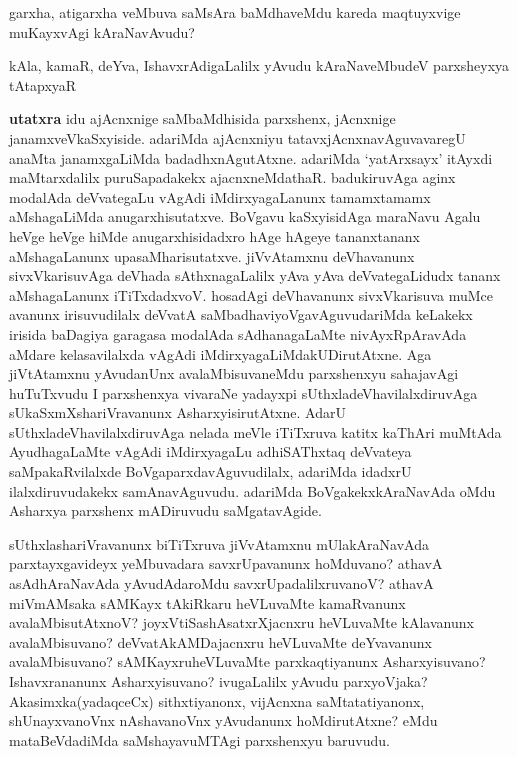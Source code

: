 
\begin{artha}
garxha, atigarxha veMbuva saMsAra baMdhaveMdu kareda maqtuyxvige muKayxvAgi kAraNavAvudu?

kAla, kamaR, deYva, IshavxrAdigaLalilx yAvudu kAraNaveMbudeV parxsheyxya tAtapxyaR\ndash 

\textbf{utatxra \ndash } idu ajAcnxnige saMbaMdhisida parxshenx, jAcnxnige janamxveVkaSxyiside. adariMda ajAcnxniyu tatavxjAcnxnavAguvavaregU  anaMta janamxgaLiMda badadhxnAgutAtxne. adariMda `yatArxsayx' itAyxdi maMtarxdalilx puruSapadakekx ajacnxneMdathaR. badukiruvAga aginx modalAda deVvategaLu vAgAdi iMdirxyagaLanunx tamamxtamamx aMshagaLiMda anugarxhisutatxve. BoVgavu kaSxyisidAga maraNavu Agalu heVge heVge hiMde  anugarxhisidadxro hAge hAgeye tananxtananx aMshagaLanunx upasaMharisutatxve. jiVvAtamxnu deVhavanunx sivxVkarisuvAga deVhada sAthxnagaLalilx yAva yAva deVvategaLidudx tananx aMshagaLanunx iTiTxdadxvoV. hosadAgi deVhavanunx sivxVkarisuva muMce avanunx irisuvudilalx deVvatA saMbadhaviyoVgavAguvudariMda keLakekx irisida baDagiya garagasa modalAda sAdhanagaLaMte nivAyxRpAravAda aMdare kelasavilalxda vAgAdi iMdirxyagaLiMdakUDirutAtxne. Aga jiVtAtamxnu yAvudanUnx avalaMbisuvaneMdu parxshenxyu sahajavAgi huTuTxvudu \ndash  I parxshenxya vivaraNe \ndash  yadayxpi sUthxladeVhavilalxdiruvAga sUkaSxmXshariVravanunx AsharxyisirutAtxne. AdarU sUthxladeVhavilalxdiruvAga nelada meVle iTiTxruva katitx kaThAri muMtAda AyudhagaLaMte vAgAdi iMdirxyagaLu adhiSAThxtaq deVvateya saMpakaRvilalxde BoVgaparxdavAguvudilalx, adariMda idadxrU ilalxdiruvudakekx samAnavAguvudu. adariMda BoVgakekxkAraNavAda oMdu Asharxya parxshenx mADiruvudu saMgatavAgide.

sUthxlashariVravanunx biTiTxruva jiVvAtamxnu mUlakAraNavAda parxtayxgavideyx yeMbuvadara savxrUpavanunx hoMduvano? athavA asAdhAraNavAda yAvudAdaroMdu savxrUpadalilxruvanoV? athavA miVmAMsaka sAMKayx tAkiRkaru heVLuvaMte kamaRvanunx avalaMbisutAtxnoV? joyxVtiSashAsatxrXjacnxru heVLuvaMte kAlavanunx avalaMbisuvano? deVvatAkAMDajacnxru heVLuvaMte deYvavanunx avalaMbisuvano? sAMKayxruheVLuvaMte parxkaqtiyanunx Asharxyisuvano? Ishavxrananunx Asharxyisuvano? ivugaLalilx yAvudu parxyoVjaka? Akasimxka(yadaqceCx) sithxtiyanonx, vijAcnxna saMtatatiyanonx, shUnayxvanoVnx nAshavanoVnx yAvudanunx hoMdirutAtxne? eMdu mataBeVdadiMda saMshayavuMTAgi parxshenxyu baruvudu.


\end{artha}
